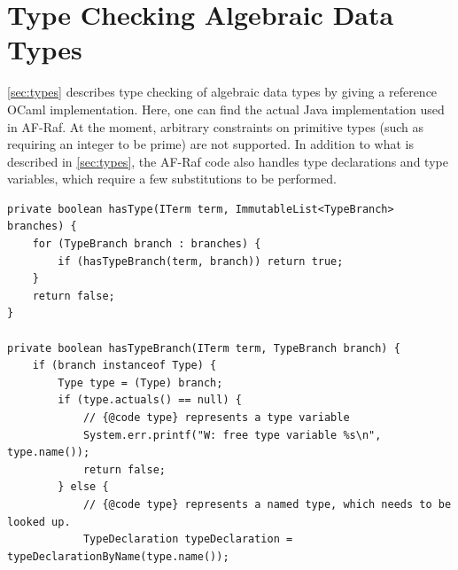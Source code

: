 \documentclass[a4paper,12pt,oneside,fleqn]{book} %
\begin{document}
\section{Type Checking Algebraic Data Types}\label{app:tc} %

\autoref{sec:types} describes type checking of algebraic data types
  by giving a reference OCaml implementation.
Here, one can find the actual Java implementation used in AF-Raf.
At the moment,
  arbitrary constraints on primitive types
    (such as requiring an integer to be prime)
    are not supported.
In addition to what is described in \autoref{sec:types},
  the AF-Raf code also handles type declarations and type variables,
  which require a few substitutions to be performed.

{\tiny
\begin{verbatim}
private boolean hasType(ITerm term, ImmutableList<TypeBranch> branches) {
    for (TypeBranch branch : branches) {
        if (hasTypeBranch(term, branch)) return true;
    }
    return false;
}

private boolean hasTypeBranch(ITerm term, TypeBranch branch) {
    if (branch instanceof Type) {
        Type type = (Type) branch;
        if (type.actuals() == null) {
            // {@code type} represents a type variable
            System.err.printf("W: free type variable %s\n", type.name());
            return false;
        } else {
            // {@code type} represents a named type, which needs to be looked up.
            TypeDeclaration typeDeclaration = typeDeclarationByName(type.name());
            

\end{verbatim}}
\end{document}
